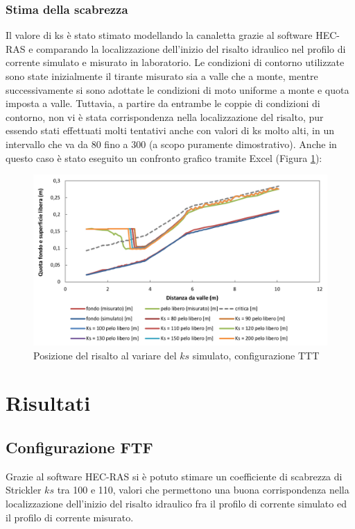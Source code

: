 \documentclass[12pt]{article} %
\begin{document}
\subsubsection{Stima della scabrezza}
\noindent Il valore di ks è stato stimato modellando la canaletta grazie al software HEC-RAS e comparando la localizzazione dell’inizio del risalto idraulico nel profilo di corrente simulato e misurato in laboratorio. Le condizioni di contorno utilizzate sono state inizialmente il tirante misurato sia a valle che a monte, mentre successivamente si sono adottate le condizioni di moto uniforme a monte e quota imposta a valle. Tuttavia, a partire da entrambe le coppie di condizioni di contorno, non vi è stata corrispondenza nella localizzazione del risalto, pur essendo stati effettuati molti tentativi anche con valori di ks molto alti, in un intervallo che va da 80 fino a 300 (a scopo puramente dimostrativo). Anche in questo caso è stato eseguito un confronto grafico tramite Excel (Figura \ref{fig:risalto_TTT}):

\begin{figure}[H]
    \centering
    \includegraphics[width=\textwidth]{TTTrisalto6.5.png}
    \caption{Posizione del risalto al variare del $ks$ simulato, configurazione TTT}
    \label{fig:risalto_TTT}
\end{figure}
\newpage
\section{Risultati}
\subsection{Configurazione FTF}
\noindent Grazie al software HEC-RAS si è potuto stimare un coefficiente di scabrezza di Strickler $ks$ tra 100 e 110, valori che permettono una buona corrispondenza nella localizzazione dell’inizio del risalto idraulico fra il profilo di corrente simulato ed il profilo di corrente misurato.
\end{document}

